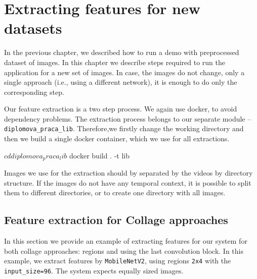 \chapter{Extracting features for new datasets}

In the previous chapter, we described how to run a demo with preprocessed dataset of images. In this chapter we describe steps required to run the application for a new set of images. In case, the images do not change, only a single approach (i.e., using a different network), it is enough to do only the corresponding step.

Our feature extraction is a two step process. We again use docker, to avoid dependency problems. The extraction process belongs to our separate module -- \verb+diplomova_praca_lib+. Therefore,we  firstly change the working directory and then we build a single docker container, which we use for all extractions.

\vspace{0.5cm}
\begin{boxedverbatim}
$ cd diplomova_praca_lib
$ docker build . -t lib
\end{boxedverbatim}
\vspace{0.5cm}

Images we use for the extraction should by separated by the videos by directory structure. If the images do not have any temporal context, it is possible to split them to different directories, or to create one directory with all images.

\section{Feature extraction for Collage approaches}

In this section we provide an example of extracting features for our system for both collage approaches: regions and using the last convolution block. In this example, we extract features by \verb+MobileNetV2+, using regions \verb+2x4+ with the \verb+input_size=96+. The system expects equally sized images.

\vspace{0.5cm}

